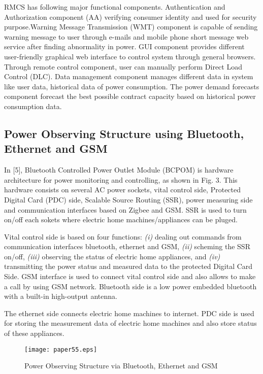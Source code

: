 \documentclass[10pt, conference, compsocconf]{IEEEtran}
\begin{document}
RMCS has following major functional components. Authentication and Authorization component (AA) verifying consumer identity and used for security purpose.Warning Message Transmission (WMT) component is capable of sending warning message to user through e-mails and mobile phone short message web service after finding abnormality in power. GUI component provides different user-friendly graphical web interface to control system through general browsers. Through remote control component, user can manually perform Direct Load Control (DLC). Data management component manages different data in system like user data, historical data of power consumption. The power demand forecasts component forecast the best possible contract capacity based on historical power consumption data.

\subsection{Power Observing Structure using Bluetooth, Ethernet and GSM }
In [5], Bluetooth Controlled Power Outlet Module (BCPOM) is hardware architecture for power monitoring and controlling, as shown in Fig. 3. This hardware consists on several AC power sockets, vital control side, Protected Digital Card (PDC) side, Scalable Source Routing (SSR), power measuring side and  communication interfaces based on Zigbee and GSM. SSR is used to turn on/off each sokets where electric home machines/appliances can be pluged.

Vital control side is based on four functions: \textit{(i)} dealing out commands from communication interfaces bluetooth, ethernet and GSM, \textit{(ii)} scheming the SSR on/off, \textit{(iii)} observing the status of electric home appliances, and \textit{(iv)} transmitting the power status and measured data to the protected Digital Card Side. GSM interface is used to connect vital control side and also allows to make a call by using GSM network. Bluetooth side is a low power embedded bluetooth with a built-in high-output antenna.

The ethernet side connects electric home machines to internet. PDC side is used for storing the measurement data of electric home machines and also store status of these appliances.

\begin{figure*}[t]
\centering
  \texttt{[image: paper55.eps]}
  \caption{Power Observing Structure via Bluetooth, Ethernet and GSM}
\end{figure*}
\end{document}
